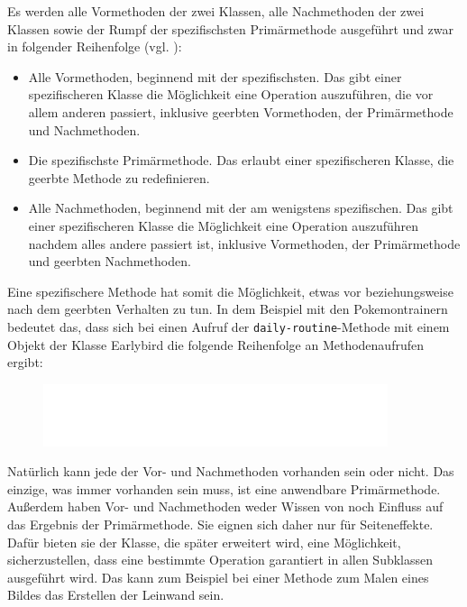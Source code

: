 Es werden alle Vormethoden der zwei Klassen, alle Nachmethoden der zwei Klassen sowie der Rumpf der spezifischsten Primärmethode ausgeführt und zwar in folgender Reihenfolge (vgl. \cite[S. 50]{keene}):
\begin{itemize}
 \item Alle Vormethoden, beginnend mit der spezifischsten. Das gibt einer spezifischeren Klasse die Möglichkeit eine Operation auszuführen, die vor allem anderen passiert, inklusive geerbten Vormethoden, der Primärmethode und Nachmethoden.
 \item Die spezifischste Primärmethode. Das erlaubt einer spezifischeren Klasse, die geerbte Methode zu redefinieren.
 \item Alle Nachmethoden, beginnend mit der am wenigstens spezifischen. Das gibt einer spezifischeren Klasse die Möglichkeit eine Operation auszuführen nachdem alles andere passiert ist, inklusive Vormethoden, der Primärmethode und geerbten Nachmethoden.
\end{itemize}

Eine spezifischere Methode hat somit die Möglichkeit, etwas vor beziehungsweise nach dem geerbten Verhalten zu tun. In dem Beispiel mit den Pokemontrainern bedeutet das, dass sich bei einen Aufruf der \texttt{daily-routine}-Methode mit einem Objekt der Klasse Earlybird die folgende Reihenfolge an Methodenaufrufen ergibt:

\begin{figure}[h]
 \centering
 \includegraphics[width=0.9\textwidth]{pictures/primary}
\end{figure}

Natürlich kann jede der Vor- und Nachmethoden vorhanden sein oder nicht. Das einzige, was immer vorhanden sein muss, ist eine anwendbare Primärmethode. Außerdem haben Vor- und Nachmethoden weder Wissen von noch Einfluss auf das Ergebnis der Primärmethode. Sie eignen sich daher nur für Seiteneffekte. Dafür bieten sie der Klasse, die später erweitert wird, eine Möglichkeit, sicherzustellen, dass eine bestimmte Operation garantiert in allen Subklassen ausgeführt wird. Das kann zum Beispiel bei einer Methode zum Malen eines Bildes das Erstellen der Leinwand sein.

